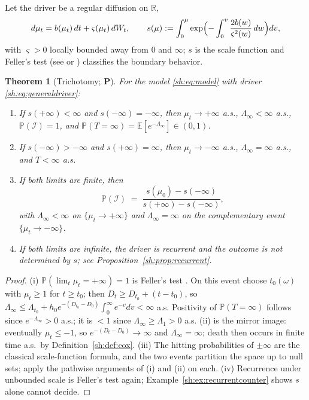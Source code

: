 \documentclass[11pt]{article}
\numberwithin{equation}{section}
\theoremstyle{plain}
\newtheorem{theorem}{Theorem}[section]
\theoremstyle{definition}
\theoremstyle{remark}
\newcommand{\E}{\mathbb{E}}
\newcommand{\PP}{\mathbb{P}}
\newcommand{\R}{\mathbb{R}}
\newcommand{\Imm}{\mathcal{I}}
\begin{document}
Let the driver be a regular diffusion on $\R$,
\begin{equation}\label{sh:eq:generaldriver}
d\mu_t=b(\mu_t)\,dt+\varsigma(\mu_t)\,dW_t,\qquad
s(\mu):=\int_{0}^{\mu}\exp\Bigl(-\int_{0}^{v}\frac{2b(w)}{\varsigma^2(w)}
\,dw\Bigr)dv,
\end{equation}
with $\varsigma>0$ locally bounded away from $0$ and $\infty$; $s$ is the
scale function and Feller's test (see \cite[Ch.~15]{KT81} or
\cite[Ch.~VII]{RY99}) classifies the boundary behavior.

\begin{theorem}[Trichotomy; \textbf{P}]\label{sh:thm:trichotomy}
For the model \eqref{sh:eq:model} with driver
\eqref{sh:eq:generaldriver}:
\begin{enumerate}[label=\emph{(\roman*)},itemsep=1pt]
\item If $s(+\infty)<\infty$ and $s(-\infty)=-\infty$, then
$\mu_t\to+\infty$ a.s., $\Lambda_\infty<\infty$ a.s., $\PP(\Imm)=1$, and
$\PP(T=\infty)=\E[e^{-\Lambda_\infty}]\in(0,1)$.
\item If $s(-\infty)>-\infty$ and $s(+\infty)=\infty$, then
$\mu_t\to-\infty$ a.s., $\Lambda_\infty=\infty$ a.s., and $T<\infty$ a.s.
\item If both limits are finite, then
\begin{equation}\label{sh:eq:scaleformula}
\PP(\Imm)\;=\;\frac{s(\mu_0)-s(-\infty)}{s(+\infty)-s(-\infty)},
\end{equation}
with $\Lambda_\infty<\infty$ on $\{\mu_t\to+\infty\}$ and
$\Lambda_\infty=\infty$ on the complementary event
$\{\mu_t\to-\infty\}$.
\item If both limits are infinite, the driver is recurrent and the outcome
is \emph{not} determined by $s$; see
Proposition~\ref{sh:prop:recurrent}.
\end{enumerate}
\end{theorem}

\begin{proof}
(i) $\PP(\lim_t\mu_t=+\infty)=1$ is Feller's test \cite{KT81}. On this
event choose $t_0(\omega)$ with $\mu_t\ge1$ for $t\ge t_0$; then
$D_t\ge D_{t_0}+(t-t_0)$, so
$\Lambda_\infty\le\Lambda_{t_0}+h_0e^{-(D_{t_0}-D_0)}\int_0^\infty
e^{-v}dv<\infty$ a.s. Positivity of $\PP(T=\infty)$ follows since
$e^{-\Lambda_\infty}>0$ a.s.; it is $<1$ since $\Lambda_\infty\ge
\Lambda_1>0$ a.s. (ii) is the mirror image: eventually $\mu_t\le-1$, so
$e^{-(D_t-D_0)}\to\infty$ and $\Lambda_\infty=\infty$; death then occurs in
finite time a.s.\ by Definition~\ref{sh:def:cox}. (iii) The hitting
probabilities of $\pm\infty$ are the classical scale-function formula, and
the two events partition the space up to null sets; apply the pathwise
arguments of (i) and (ii) on each. (iv) Recurrence under unbounded scale is
Feller's test again; Example~\ref{sh:ex:recurrentcounter} shows $s$ alone
cannot decide.
\end{proof}
\end{document}
